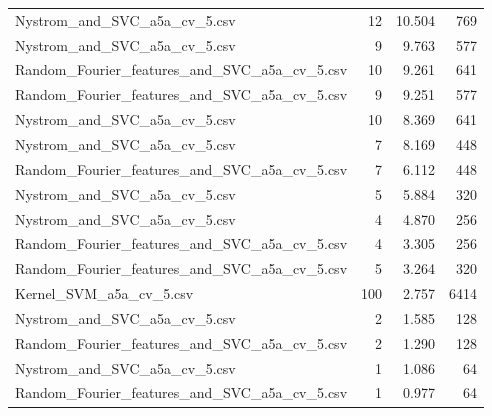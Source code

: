 \begin{tabularx}{\textwidth}{lrrr}
                Nystrom\_and\_SVC\_a5a\_cv\_5.csv &       12 &              10.504 &           769 \\
                Nystrom\_and\_SVC\_a5a\_cv\_5.csv &        9 &               9.763 &           577 \\
Random\_Fourier\_features\_and\_SVC\_a5a\_cv\_5.csv &       10 &               9.261 &           641 \\
Random\_Fourier\_features\_and\_SVC\_a5a\_cv\_5.csv &        9 &               9.251 &           577 \\
                Nystrom\_and\_SVC\_a5a\_cv\_5.csv &       10 &               8.369 &           641 \\
                Nystrom\_and\_SVC\_a5a\_cv\_5.csv &        7 &               8.169 &           448 \\
Random\_Fourier\_features\_and\_SVC\_a5a\_cv\_5.csv &        7 &               6.112 &           448 \\
                Nystrom\_and\_SVC\_a5a\_cv\_5.csv &        5 &               5.884 &           320 \\
                Nystrom\_and\_SVC\_a5a\_cv\_5.csv &        4 &               4.870 &           256 \\
Random\_Fourier\_features\_and\_SVC\_a5a\_cv\_5.csv &        4 &               3.305 &           256 \\
Random\_Fourier\_features\_and\_SVC\_a5a\_cv\_5.csv &        5 &               3.264 &           320 \\
                     Kernel\_SVM\_a5a\_cv\_5.csv &      100 &               2.757 &          6414 \\
                Nystrom\_and\_SVC\_a5a\_cv\_5.csv &        2 &               1.585 &           128 \\
Random\_Fourier\_features\_and\_SVC\_a5a\_cv\_5.csv &        2 &               1.290 &           128 \\
                Nystrom\_and\_SVC\_a5a\_cv\_5.csv &        1 &               1.086 &            64 \\
Random\_Fourier\_features\_and\_SVC\_a5a\_cv\_5.csv &        1 &               0.977 &            64 \\
\bottomrule
\end{tabularx}
